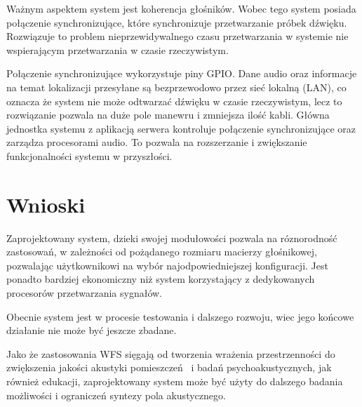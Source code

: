 \documentclass[12pt]{oska}
\let\Oldsection\section
\renewcommand{\section}{\FloatBarrier\Oldsection}
\begin{document}
Ważnym aspektem system jest koherencja głośników. Wobec tego system posiada
połączenie synchronizujące, które synchronizuje przetwarzanie próbek dźwięku.
Rozwiązuje to problem nieprzewidywalnego czasu przetwarzania w systemie nie
wspierającym przetwarzania w czasie rzeczywistym.

Połączenie synchronizujące wykorzystuje piny GPIO. Dane audio oraz informacje
na temat lokalizacji przesyłane są bezprzewodowo przez sieć lokalną (LAN), co
oznacza że system nie może odtwarzać dźwięku w czasie rzeczywistym, lecz to
rozwiązanie pozwala na duże pole manewru i zmniejsza ilość kabli. Główna
jednostka systemu z aplikacją serwera kontroluje połączenie synchronizujące
oraz zarządza procesorami audio. To pozwala na rozszerzanie i zwiększanie
funkcjonalności systemu w przyszłości.

\section{Wnioski}
Zaprojektowany system, dzieki swojej modułowości pozwala na róznorodność
zastosowań, w zależności od pożądanego rozmiaru macierzy głośnikowej,
pozwalając użytkownikowi na wybór najodpowiedniejszej konfiguracji. Jest
ponadto bardziej ekonomiczny niż system korzystający z dedykowanych procesorów
przetwarzania sygnałów.

Obecnie system jest w procesie testowania i dalszego rozwoju, wiec jego końcowe
działanie nie może być jeszcze zbadane.

Jako że zastosowania WFS sięgają od tworzenia wrażenia przestrzenności do
zwiększenia jakości akustyki pomieszczeń~\cite{enhancement} i badań
psychoakustycznych, jak również edukacji, zaprojektowany system może być użyty
do dalszego badania możliwości i ograniczeń syntezy pola akustycznego.

\printbibliography
\end{document}
